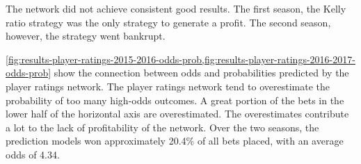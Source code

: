 The network did not achieve consistent good results. The first season, the Kelly ratio strategy was the only strategy to generate a profit. The second season, however, the strategy went bankrupt.

\cref{fig:results-player-ratings-2015-2016-odds-prob,fig:results-player-ratings-2016-2017-odds-prob} show the connection between odds and probabilities predicted by the player ratings network. The player ratings network tend to overestimate the probability of too many high-odds outcomes. A great portion of the bets in the lower half of the horizontal axis are overestimated. The overestimates contribute a lot to the lack of profitability of the network. Over the two seasons, the prediction models won approximately 20.4\% of all bets placed, with an average odds of 4.34.
